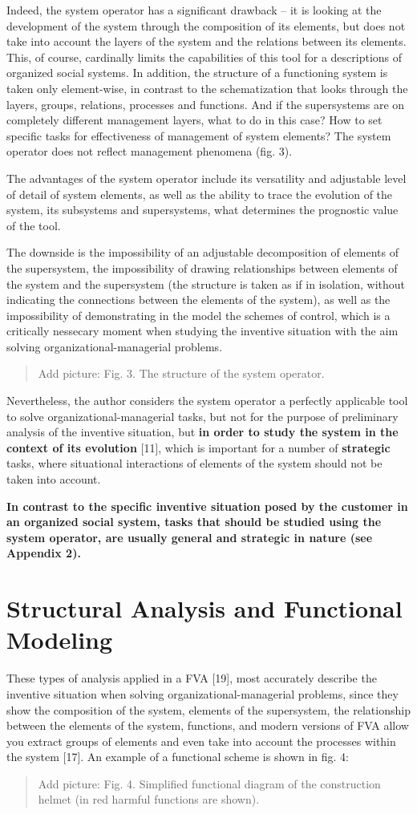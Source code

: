 \documentclass[11pt,a4paper]{book}
\newcommand{\addpicture}[1]{
  \begin{quote} Add picture: #1\end{quote}
}
\begin{document}
Indeed, the system operator has a significant drawback -- it is looking at the
development of the system through the composition of its elements, but does
not take into account the layers of the system and the relations between its
elements. This, of course, cardinally limits the capabilities of this tool for
a descriptions of organized social systems. In addition, the structure of a
functioning system is taken only element-wise, in contrast to the
schematization that looks through the layers, groups, relations, processes and
functions. And if the supersystems are on completely different management
layers, what to do in this case? How to set specific tasks for effectiveness
of management of system elements?  The system operator does not reflect
management phenomena (fig. 3).

The advantages of the system operator include its versatility and adjustable
level of detail of system elements, as well as the ability to trace the
evolution of the system, its subsystems and supersystems, what determines the
prognostic value of the tool.

The downside is the impossibility of an adjustable decomposition of elements
of the supersystem, the impossibility of drawing relationships between
elements of the system and the supersystem (the structure is taken as if in
isolation, without indicating the connections between the elements of the
system), as well as the impossibility of demonstrating in the model the
schemes of control, which is a critically nessecary moment when studying the
inventive situation with the aim solving organizational-managerial problems.

\addpicture{Fig. 3. The structure of the system operator.}

Nevertheless, the author considers the system operator a perfectly applicable
tool to solve organizational-managerial tasks, but not for the purpose of
preliminary analysis of the inventive situation, but \textbf{in order to study
  the system in the context of its evolution} [11], which is important for a
number of \textbf{strategic} tasks, where situational interactions of elements
of the system should not be taken into account.

\textbf{In contrast to the specific inventive situation posed by the customer
  in an organized social system, tasks that should be studied using the system
  operator, are usually general and strategic in nature (see Appendix 2).}

\section{Structural Analysis and Functional Modeling}
These types of analysis applied in a FVA [19], most accurately describe the
inventive situation when solving organizational-managerial problems, since
they show the composition of the system, elements of the supersystem, the
relationship between the elements of the system, functions, and modern
versions of FVA allow you extract groups of elements and even take into
account the processes within the system [17]. An example of a functional
scheme is shown in fig. 4:

\addpicture{Fig. 4. Simplified functional diagram of the construction helmet
  (in red harmful functions are shown).}
\end{document}
